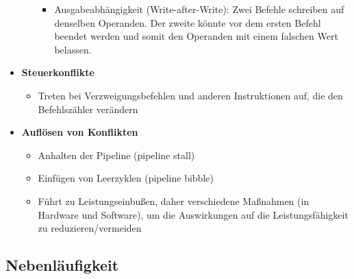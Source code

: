 \begin{itemize}
\begin{itemize}
\begin{itemize}
			\item Ausgabeabhängigkeit (Write-after-Write): Zwei Befehle schreiben auf denselben Operanden. Der zweite könnte vor dem ersten Befehl beendet werden und somit den Operanden mit einem falschen Wert belassen.
		\end{itemize}
	\end{itemize}
	\item \textbf{Steuerkonflikte}
	\begin{itemize}
		\item Treten bei Verzweigungsbefehlen und anderen Instruktionen auf, die den Befehlszähler verändern
	\end{itemize}
	\item \textbf{Auflösen von Konflikten}
	\begin{itemize}
		\item Anhalten der Pipeline (pipeline stall)
		\item Einfügen von Leerzyklen (pipeline bibble)
		\item Führt zu Leistungseinbußen, daher verschiedene Maßnahmen (in Hardware und Software), um die Auswirkungen auf die Leistungsfähigkeit zu reduzieren/vermeiden
	\end{itemize}
\end{itemize}


\subsection{Nebenläufigkeit}

